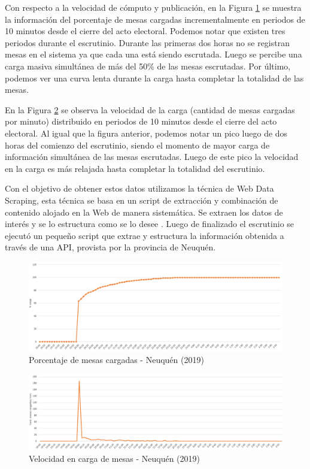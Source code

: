 Con respecto a la velocidad de cómputo y publicación, en la Figura \ref{graf:porcentajeNeuquen} se muestra la información del porcentaje de mesas cargadas incrementalmente en periodos de 10 minutos desde el cierre del acto electoral. Podemos notar que existen tres periodos durante el escrutinio. Durante las primeras dos horas no se registran mesas en el sistema ya que cada una está siendo escrutada. Luego se percibe una carga masiva simultánea de más del 50\% de las mesas escrutadas. Por último, podemos ver una curva lenta durante la carga hasta completar la totalidad de las mesas.

En la Figura \ref{graf:velocidadNeuquen} se observa la velocidad de la carga (cantidad de mesas cargadas por minuto) distribuido en periodos de 10 minutos desde el cierre del acto electoral. Al igual que la figura anterior, podemos notar un pico luego de dos horas del comienzo del escrutinio, siendo el momento de mayor carga de información simultánea de las mesas escrutadas. Luego de este pico la velocidad en la carga es más relajada hasta completar la totalidad del escrutinio.

Con el objetivo de obtener estos datos utilizamos la técnica de Web Data Scraping, esta técnica se basa en un script de extracción y combinación de contenido alojado en la Web de manera sistemática. Se extraen los datos de interés y se lo estructura como se lo desee \cite{glez2014web}.
Luego de finalizado el escrutinio se ejecutó un pequeño script que extrae y estructura la información obtenida a través de una API, provista por la provincia de Neuquén. 

\begin{figure}[h!]
  \includegraphics[width=1\textwidth]{img/fOI0sHj9ac.png}
  \caption{Porcentaje de mesas cargadas - Neuquén (2019)}
  \label{graf:porcentajeNeuquen}
\end{figure}

\begin{figure}[h!]
  \includegraphics[width=1\textwidth]{img/QOsSnICbyL.png}
  \caption{Velocidad en carga de mesas - Neuquén (2019)}
  \label{graf:velocidadNeuquen}
\end{figure}


